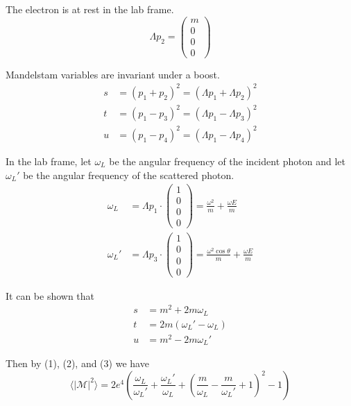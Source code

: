 The electron is at rest in the lab frame.
\begin{equation*}
\Lambda p_2=\begin{pmatrix}m\\0\\0\\0\end{pmatrix}
\end{equation*}

Mandelstam variables are invariant under a boost.
\begin{equation*}
\begin{aligned}
s&=(p_1+p_2)^2=(\Lambda p_1+\Lambda p_2)^2
\\
t&=(p_1-p_3)^2=(\Lambda p_1-\Lambda p_3)^2
\\
u&=(p_1-p_4)^2=(\Lambda p_1-\Lambda p_4)^2
\end{aligned}
\end{equation*}

In the lab frame, let $\omega_L$ be the angular frequency of the incident photon
and let $\omega_L'$ be the angular frequency of the scattered photon.
\begin{equation*}
\begin{aligned}
\omega_L&=\Lambda p_1\cdot
\begin{pmatrix}1\\0\\0\\0\end{pmatrix}
=\frac{\omega^2}{m}+\frac{\omega E}{m}
\\[1ex]
\omega_L'&=\Lambda p_3\cdot
\begin{pmatrix}1\\0\\0\\0\end{pmatrix}
=\frac{\omega^2\cos\theta}{m}+\frac{\omega E}{m}
\end{aligned}
\end{equation*}

It can be shown that
\begin{equation*}
\begin{aligned}
s&=m^2+2m\omega_L
\\
t&=2m(\omega_L' - \omega_L)
\\
u&=m^2-2 m \omega_L'
\end{aligned}
\tag{3}
\end{equation*}

Then by (1), (2), and (3) we have
\begin{equation*}
\langle|\mathcal{M}|^2\rangle=
2e^4\left(
\frac{\omega_L}{\omega_L'}+\frac{\omega_L'}{\omega_L}
+\left(\frac{m}{\omega_L}-\frac{m}{\omega_L'}+1\right)^2-1
\right)
\end{equation*}

